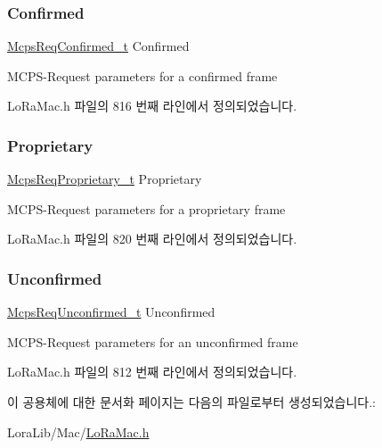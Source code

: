 \subsubsection{\texorpdfstring{Confirmed}{Confirmed}}
{\footnotesize\ttfamily \mbox{\hyperlink{group___l_o_r_a_m_a_c_ga02103c0ee1374a6b1eec217f148ec0e2}{Mcps\+Req\+Confirmed\+\_\+t}} Confirmed}

M\+C\+P\+S-\/\+Request parameters for a confirmed frame 

Lo\+Ra\+Mac.\+h 파일의 816 번째 라인에서 정의되었습니다.

\mbox{\label{unions_mcps_req_1_1u_mcps_param_ad79bb26667e5f61b5e5dd5d58a085b48}} 
\subsubsection{\texorpdfstring{Proprietary}{Proprietary}}
{\footnotesize\ttfamily \mbox{\hyperlink{group___l_o_r_a_m_a_c_gac856bc282e89301412e0a294b3e663c4}{Mcps\+Req\+Proprietary\+\_\+t}} Proprietary}

M\+C\+P\+S-\/\+Request parameters for a proprietary frame 

Lo\+Ra\+Mac.\+h 파일의 820 번째 라인에서 정의되었습니다.

\mbox{\label{unions_mcps_req_1_1u_mcps_param_a490d6060b7d5f999539375d160304e9c}} 
\subsubsection{\texorpdfstring{Unconfirmed}{Unconfirmed}}
{\footnotesize\ttfamily \mbox{\hyperlink{group___l_o_r_a_m_a_c_gaab871b914dfa4013c176586dcc2ea6df}{Mcps\+Req\+Unconfirmed\+\_\+t}} Unconfirmed}

M\+C\+P\+S-\/\+Request parameters for an unconfirmed frame 

Lo\+Ra\+Mac.\+h 파일의 812 번째 라인에서 정의되었습니다.



이 공용체에 대한 문서화 페이지는 다음의 파일로부터 생성되었습니다.\+:\begin{DoxyCompactItemize}
\item 
Lora\+Lib/\+Mac/\mbox{\hyperlink{_lo_ra_mac_8h}{Lo\+Ra\+Mac.\+h}}\end{DoxyCompactItemize}
